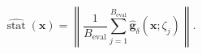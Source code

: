 \documentclass[12pt]{article}
\begin{document}
\[
 \widehat{\operatorname{stat}}(\boldsymbol x)
 =\left\lVert\frac{1}{B_{\mathrm{eval}}}
 \sum_{j=1}^{B_{\mathrm{eval}}}
 \widehat{\boldsymbol g}_{\delta}(\boldsymbol x;\zeta_j)\right\rVert .
\]
\end{document}
